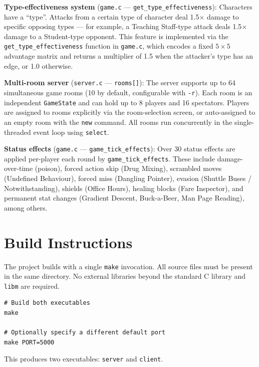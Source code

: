 \documentclass[11pt,letterpaper]{article}
\begin{document}
\textbf{Type-effectiveness system} (\texttt{game.c} --- \texttt{get\_type\_effectiveness}):
Characters have a ``type''. Attacks from a certain type of character deal 1.5$\times$ damage to specific opposing types --- for example, a Teaching Staff-type attack deals 1.5$\times$ damage to a Student-type opponent. This feature is implemented via the \texttt{get\_type\_effectiveness} function in \texttt{game.c}, which encodes a fixed $5 \times 5$ advantage matrix and returns a multiplier of 1.5 when the attacker's type has an edge, or 1.0 otherwise.

\textbf{Multi-room server} (\texttt{server.c} --- \texttt{rooms[]}):
The server supports up to 64 simultaneous game rooms (10 by default, configurable with \texttt{-r}). Each room is an independent \texttt{GameState} and can hold up to 8 players and 16 spectators. Players are assigned to rooms explicitly via the room-selection screen, or auto-assigned to an empty room with the \texttt{new} command. All rooms run concurrently in the single-threaded event loop using \texttt{select}.

\textbf{Status effects} (\texttt{game.c} --- \texttt{game\_tick\_effects}):
Over 30 status effects are applied per-player each round by \texttt{game\_tick\_effects}. These include damage-over-time (poison), forced action skip (Drug Mixing), scrambled moves (Undefined Behaviour), forced miss (Dangling Pointer), evasion (Shuttle Buses / Notwithstanding), shields (Office Hours), healing blocks (Fare Inspector), and permanent stat changes (Gradient Descent, Buck-a-Beer, Man Page Reading), among others.

\section{Build Instructions}

The project builds with a single \texttt{make} invocation. All source files must be present in the same directory. No external libraries beyond the standard C library and \texttt{libm} are required.

\begin{lstlisting}
# Build both executables
make

# Optionally specify a different default port
make PORT=5000
\end{lstlisting}

This produces two executables: \texttt{server} and \texttt{client}.
\end{document}
